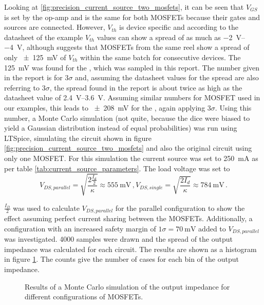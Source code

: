 Looking at \ref{fig:precision_current_source_two_mosfets}, it can be seen that $V_{GS}$ is set by the op-amp and is the same for both MOSFETs because their gates and sources are connected. However, $V_{th}$ is device specific and according to the datasheet of the example  \cite{datasheet_IRF9610} $V_{th}$ values can show a spread of as much as \qtyrange[range-units = single, range-phrase={~to~}]{-2}{-4}{\V}, although \cite{appnote_mosfet_parameter_spread} suggests that MOSFETs from the same reel show a spread of only \qty{\pm 125}{\mV} of $V_{th}$  within the same batch for consecutive devices. The \qty{125}{\mV} was found for the  \cite{datasheet_BUK7S1R5}, which was sampled in this report. The number given in the report is for $3\sigma$ and, assuming the datasheet values for the spread are also referring to $3\sigma$, the spread found in the report is about twice as high as the datasheet value of \qtyrange[range-units = single]{2.4}{3.6}{\V}. Assuming similar numbers for  MOSFET used in our examples, this leads to \qty{\pm 208}{\mV} for the , again applying $3\sigma$. Using this number, a Monte Carlo simulation (not quite, because the dice were biased to yield a Gaussian distribution instead of equal probabilities) was run using LTSpice, simulating the circuit shown in figure \ref{fig:precision_current_source_two_mosfets} and also the original circuit using only one MOSFET. For this simulation the current source was set to \qty{250}{\mA} as per table \ref{tab:current_source_parameters}. The load voltage was set to
\begin{equation*}
    V_{DS, parallel} = \sqrt{\frac{2 \frac{I_d}{2}}{\kappa}} \approx \qty{555}{\mV}\,,
    V_{DS, single} = \sqrt{\frac{2 I_d}{\kappa}} \approx \qty{784}{\mV} \,.
\end{equation*}

$\frac{I_D}{2}$ was used to calculate $V_{DS, parallel}$ for the parallel configuration to show the effect assuming perfect current sharing between the MOSFETs. Additionally, a configuration with an increased safety margin of $1 \sigma = \qty{70}{\mV}$ added to $V_{DS, parallel}$ was investigated. \num{4000} samples were drawn and the spread of the output impedance was calculated for each circuit. The results are shown as a histogram in figure \ref{fig:ltpsice_mosfet_mc_output_impedance}. The counts give the number of cases for each bin of the output impedance.
\begin{figure}[ht]
    \centering
    
    \caption{Results of a Monte Carlo simulation of the output impedance for different configurations of MOSFETs.}
    \label{fig:ltpsice_mosfet_mc_output_impedance}
\end{figure}

